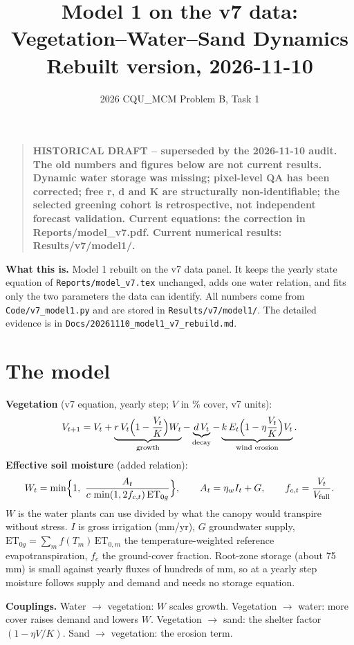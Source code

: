 \documentclass[11pt,a4paper]{article}
\title{Model 1 on the v7 data: Vegetation--Water--Sand Dynamics\\[2pt]\large Rebuilt version, 2026-11-10}
\author{2026 CQU\_MCM Problem B, Task 1}
\date{}
\begin{document}
\maketitle
\begin{quote}\small\bfseries
HISTORICAL DRAFT -- superseded by the 2026-11-10 audit. The old numbers and figures
below are not current results. Dynamic water storage was missing; pixel-level QA
has been corrected; free r, d and K are structurally non-identifiable; the selected
greening cohort is retrospective, not independent forecast validation.
Current equations: the correction in Reports/model\_v7.pdf.
Current numerical results: Results/v7/model1/.
\end{quote}


\noindent\textbf{What this is.} Model 1 rebuilt on the v7 data panel. It keeps the yearly state equation of \texttt{Reports/model\_v7.tex} unchanged, adds one water relation, and fits only the two parameters the data can identify. All numbers come from \texttt{Code/v7\_model1.py} and are stored in \texttt{Results/v7/model1/}. The detailed evidence is in \texttt{Docs/20261110\_model1\_v7\_rebuild.md}.

\section{The model}
\textbf{Vegetation} (v7 equation, yearly step; $V$ in \% cover, v7 units):
\begin{equation}
V_{t+1}=V_t+\underbrace{r\,V_t\Bigl(1-\frac{V_t}{K}\Bigr)W_t}_{\text{growth}}-\underbrace{d\,V_t}_{\text{decay}}-\underbrace{k\,E_t\Bigl(1-\eta\frac{V_t}{K}\Bigr)V_t}_{\text{wind erosion}} .
\end{equation}
\textbf{Effective soil moisture} (added relation):
\begin{equation}
W_t=\min\Bigl\{1,\ \frac{A_t}{c\,\min(1,2f_{c,t})\,\mathrm{ET}_{0g}}\Bigr\},\qquad
A_t=\eta_w I_t+G,\qquad f_{c,t}=\frac{V_t}{V_{\mathrm{full}}} .
\end{equation}
$W$ is the water plants can use divided by what the canopy would transpire without stress. $I$ is gross irrigation (mm/yr), $G$ groundwater supply, $\mathrm{ET}_{0g}=\sum_m f(T_m)\,\mathrm{ET}_{0,m}$ the temperature-weighted reference evapotranspiration, $f_c$ the ground-cover fraction. Root-zone storage (about 75 mm) is small against yearly fluxes of hundreds of mm, so at a yearly step moisture follows supply and demand and needs no storage equation.

\textbf{Couplings.} Water $\to$ vegetation: $W$ scales growth. Vegetation $\to$ water: more cover raises demand and lowers $W$. Vegetation $\to$ sand: the shelter factor $(1-\eta V/K)$. Sand $\to$ vegetation: the erosion term.
\end{document}

